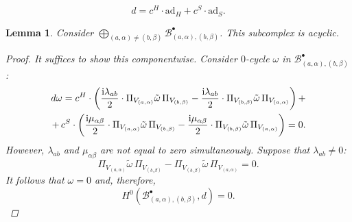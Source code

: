 \documentclass[10pt,a4paper]{amsart}
\newtheorem{lemma}{Lemma}
\begin{document}
\begin{equation}
\label{CE_diffab}
    d=c^{H}\cdot\mathrm{ad}_{H}+c^{S}\cdot\mathrm{ad}_{S}.
\end{equation}

\begin{lemma} \label{lemma:acyclic}
    Consider $\bigoplus_{(a,\alpha)\neq(b,\beta)}\mathcal{B}_{(a,\alpha),(b,\beta)}^\bullet$. This subcomplex is acyclic.
    \begin{proof}
        It suffices to show this componentwise. Consider $0$-cycle $\omega$ in $\mathcal{B}^{\bullet}_{(a,\alpha),(b,\beta)}$:
        \begin{eqnarray}
            \notag d\omega=c^{H}\cdot \left(\frac{\mathrm{i}\lambda_{ab}}{2}\cdot \Pi_{V_{(a,\alpha)}}\tilde{\omega}\,\Pi_{V_{(b,\beta)}}-\frac{\mathrm{i}\lambda_{ab}}{2}\cdot \Pi_{V_{(b,\beta)}}\tilde{\omega}\,\Pi_{V_{(a,\alpha)}}\right)+\\+\,c^{S}\cdot \left(\frac{\mathrm{i}\mu_{\alpha\beta}}{2}\cdot \Pi_{V_{(a,\alpha)}}\tilde{\omega}\,\Pi_{V_{(b,\beta)}}-\frac{\mathrm{i}\mu_{\alpha\beta}}{2}\cdot \Pi_{V_{(b,\beta)}}\tilde{\omega}\,\Pi_{V_{(a,\alpha)}}\right)=0.
        \end{eqnarray}
        However, $\lambda_{ab}$ and $\mu_{\alpha\beta}$ are not equal to zero simultaneously. Suppose that $\lambda_{ab}\neq 0$:
        \begin{equation}
            \Pi_{V_{(a,\alpha)}}\tilde{\omega}\,\Pi_{V_{(b,\beta)}}- \Pi_{V_{(b,\beta)}}\tilde{\omega}\,\Pi_{V_{(a,\alpha)}}=0.
        \end{equation}
        It follows that $\omega=0$ and, therefore,
        \begin{equation}
        H^{0}(\mathcal{B}^{\bullet}_{(a,\alpha),(b,\beta)},d)=0.
        \end{equation}


\end{proof}
\end{lemma}
\end{document}
